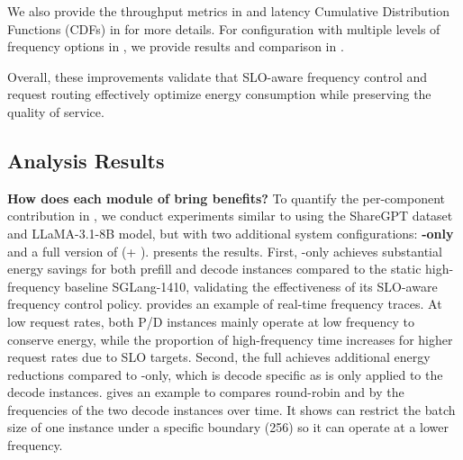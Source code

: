 We also provide the throughput metrics in  and latency Cumulative Distribution Functions (CDFs) in  for more details.
For configuration with multiple levels of frequency options in \governor, we provide results and comparison in .


Overall, these improvements validate that SLO-aware frequency control and request routing effectively optimize energy consumption while preserving the quality of service. 






\subsection{Analysis Results}
\label{subsec:analysis}


\noindent
\textbf{How does each module of \name bring benefits?}
To quantify the per-component contribution in \name, we conduct experiments similar to  using the ShareGPT dataset and LLaMA-3.1-8B model, but with two additional system configurations: \textbf{\governor-only} and a full version of \textbf{\name} (\governor+ \router).
 presents the results.
First, \governor-only achieves substantial energy savings for both prefill and decode instances compared to the static high-frequency baseline SGLang-1410, validating the effectiveness of its SLO-aware frequency control policy.
 provides an example of real-time frequency traces.
At low request rates, both P/D instances mainly operate at low frequency to conserve energy, while the proportion of high-frequency time increases for higher request rates due to SLO targets.
Second, the full \name achieves additional energy reductions compared to \governor-only, which is decode specific as \router is only applied to the decode instances.
 gives an example to compares round-robin and \router by the frequencies of the two decode instances over time.
It shows \router can restrict the batch size of one instance under a specific boundary (256) so it can operate at a lower frequency.



